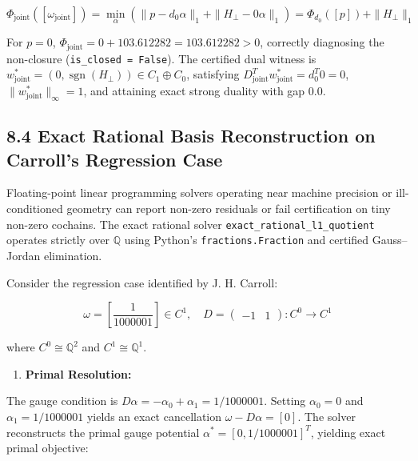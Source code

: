 \documentclass[11pt]{article}
\begin{document}
\begin{equation*}
   \Phi_{\mathrm{joint}}([\omega_{\mathrm{joint}}]) = \min_\alpha \left( \|p - d_0 \alpha\|_1 + \|H_\perp - 0 \alpha\|_1 \right) = \Phi_{d_0}([p]) + \|H_\perp\|_1
\end{equation*}

For $p = 0$, $\Phi_{\mathrm{joint}} = 0 + 103.612282 = 103.612282 > 0$, correctly diagnosing the non-closure (\texttt{is\_closed = False}). The certified dual witness is $w^*_{\mathrm{joint}} = (0, \operatorname{sgn}(H_\perp)) \in C_1 \oplus C_0$, satisfying $D_{\mathrm{joint}}^T w^*_{\mathrm{joint}} = d_0^T 0 = 0$, $\|w^*_{\mathrm{joint}}\|_\infty = 1$, and attaining exact strong duality with gap $0.0$.

\subsection{\texorpdfstring{8.4 Exact Rational Basis Reconstruction on Carroll's Regression Case}{8.4 Exact Rational Basis Reconstruction on Carroll's Regression Case}}

Floating-point linear programming solvers operating near machine precision or ill-conditioned geometry can report non-zero residuals or fail certification on tiny non-zero cochains. The exact rational solver \texttt{exact\_rational\_l1\_quotient} operates strictly over $\mathbb{Q}$ using Python's \texttt{fractions.Fraction} and certified Gauss--Jordan elimination.

Consider the regression case identified by J. H. Carroll:

\begin{equation*}
\omega = \left[ \frac{1}{1000001} \right] \in C^1, \quad D = \begin{pmatrix} -1 & 1 \end{pmatrix}: C^0 \to C^1
\end{equation*}

where $C^0 \cong \mathbb{Q}^2$ and $C^1 \cong \mathbb{Q}^1$.

\begin{enumerate}[leftmargin=1.4em,itemsep=0.2em]
\item \textbf{Primal Resolution:}
\end{enumerate}
The gauge condition is $D \alpha = -\alpha_0 + \alpha_1 = 1/1000001$. Setting $\alpha_0 = 0$ and $\alpha_1 = 1/1000001$ yields an exact cancellation $\omega - D\alpha = [0]$. The solver reconstructs the primal gauge potential $\alpha^* = [0, 1/1000001]^T$, yielding exact primal objective:
\end{document}

